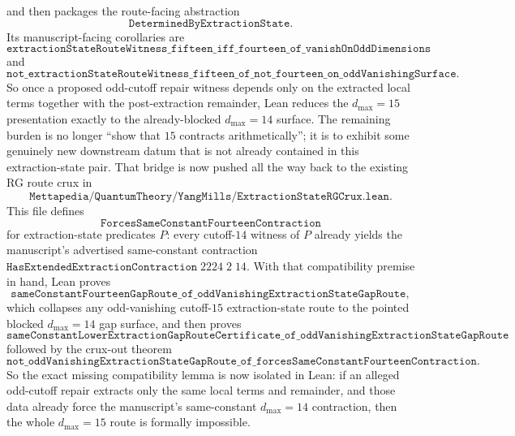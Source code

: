 \documentclass[11pt]{article}
\newcommand{\lean}[1]{\texttt{#1}}
\begin{document}
and then packages the route-facing abstraction
\[
  \lean{DeterminedByExtractionState}.
\]
Its manuscript-facing corollaries are
\[
  \lean{extractionStateRouteWitness\_fifteen\_iff\_fourteen\_of\_vanishOnOddDimensions}
\]
and
\[
  \lean{not\_extractionStateRouteWitness\_fifteen\_of\_not\_fourteen\_on\_oddVanishingSurface}.
\]
So once a proposed odd-cutoff repair witness depends only on the extracted
local terms together with the post-extraction remainder, Lean reduces the
\(d_{\max}=15\) presentation exactly to the already-blocked \(d_{\max}=14\)
surface.  The remaining burden is no longer “show that \(15\) contracts
arithmetically”; it is to exhibit some genuinely new downstream datum that is
not already contained in this extraction-state pair.
That bridge is now pushed all the way back to the existing RG route crux in
\[
  \lean{Mettapedia/QuantumTheory/YangMills/ExtractionStateRGCrux.lean}.
\]
This file defines
\[
  \lean{ForcesSameConstantFourteenContraction}
\]
for extraction-state predicates \(P\): every cutoff-\(14\) witness of \(P\)
already yields the manuscript's advertised same-constant contraction
\(\lean{HasExtendedExtractionContraction}\;2224\;2\;14\).
With that compatibility premise in hand, Lean proves
\[
  \lean{sameConstantFourteenGapRoute\_of\_oddVanishingExtractionStateGapRoute},
\]
which collapses any odd-vanishing cutoff-\(15\) extraction-state route to the
pointed blocked \(d_{\max}=14\) gap surface, and then proves
\[
  \lean{sameConstantLowerExtractionGapRouteCertificate\_of\_oddVanishingExtractionStateGapRoute}
\]
followed by the crux-out theorem
\[
  \lean{not\_oddVanishingExtractionStateGapRoute\_of\_forcesSameConstantFourteenContraction}.
\]
So the exact missing compatibility lemma is now isolated in Lean: if an
alleged odd-cutoff repair extracts only the same local terms and remainder, and
those data already force the manuscript's same-constant \(d_{\max}=14\)
contraction, then the whole \(d_{\max}=15\) route is formally impossible.
\end{document}
